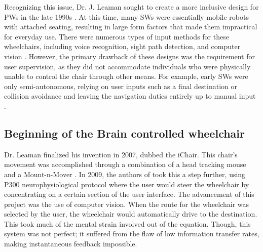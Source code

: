 \documentclass[conference]{IEEEtran}
\begin{document}
    Recognizing this issue, Dr. J. Leaman sought to create a more inclusive design for PWs in the late 1990s \cite{a_comprehensive_review}. At this time, many SWs were essentially mobile robots with attached seating, resulting in large form factors that made them impractical for everyday use. There were numerous types of input methods for these wheelchairs, including voice recognition, sight path detection, and computer vision \cite{smart_wheelchairs}. However, the primary drawback of these designs was the requirement for user supervision, as they did not accommodate individuals who were physically unable to control the chair through other means. For example, early SWs were only semi-autonomous, relying on user inputs such as a final destination or collision avoidance and leaving the navigation duties entirely up to manual input \cite{smart_wheelchairs}. 
    
    \subsection{Beginning of the Brain controlled wheelchair}
    Dr. Leaman finalized his invention in 2007, dubbed the iChair. This chair's movement was accomplished through a combination of a head tracking mouse and a Mount-n-Mover \cite{a_comprehensive_review}. In 2009, the authors of \cite{noninvasive_brain} took this a step further, using P300 neurophysiological protocol where the user would steer the wheelchair by concentrating on a certain section of the user interface. The advancement of this project was the use of computer vision. When the route for the wheelchair was selected by the user, the wheelchair would automatically drive to the destination. This took much of the mental strain involved out of the equation. Though, this system was not perfect; it suffered from the flaw of low information transfer rates, making instantaneous feedback impossible.  
    
\end{document}
